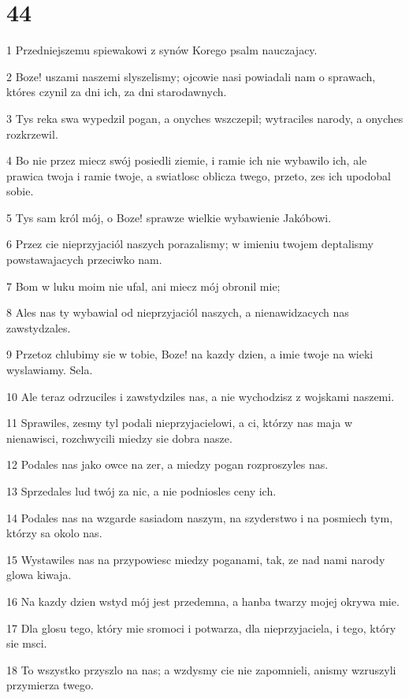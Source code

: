 \chapter{44}

\par 1 Przedniejszemu spiewakowi z synów Korego psalm nauczajacy.
\par 2 Boze! uszami naszemi slyszelismy; ojcowie nasi powiadali nam o sprawach, któres czynil za dni ich, za dni starodawnych.
\par 3 Tys reka swa wypedzil pogan, a onyches wszczepil; wytraciles narody, a onyches rozkrzewil.
\par 4 Bo nie przez miecz swój posiedli ziemie, i ramie ich nie wybawilo ich, ale prawica twoja i ramie twoje, a swiatlosc oblicza twego, przeto, zes ich upodobal sobie.
\par 5 Tys sam król mój, o Boze! sprawze wielkie wybawienie Jakóbowi.
\par 6 Przez cie nieprzyjaciól naszych porazalismy; w imieniu twojem deptalismy powstawajacych przeciwko nam.
\par 7 Bom w luku moim nie ufal, ani miecz mój obronil mie;
\par 8 Ales nas ty wybawial od nieprzyjaciól naszych, a nienawidzacych nas zawstydzales.
\par 9 Przetoz chlubimy sie w tobie, Boze! na kazdy dzien, a imie twoje na wieki wyslawiamy. Sela.
\par 10 Ale teraz odrzuciles i zawstydziles nas, a nie wychodzisz z wojskami naszemi.
\par 11 Sprawiles, zesmy tyl podali nieprzyjacielowi, a ci, którzy nas maja w nienawisci, rozchwycili miedzy sie dobra nasze.
\par 12 Podales nas jako owce na zer, a miedzy pogan rozproszyles nas.
\par 13 Sprzedales lud twój za nic, a nie podniosles ceny ich.
\par 14 Podales nas na wzgarde sasiadom naszym, na szyderstwo i na posmiech tym, którzy sa okolo nas.
\par 15 Wystawiles nas na przypowiesc miedzy poganami, tak, ze nad nami narody glowa kiwaja.
\par 16 Na kazdy dzien wstyd mój jest przedemna, a hanba twarzy mojej okrywa mie.
\par 17 Dla glosu tego, który mie sromoci i potwarza, dla nieprzyjaciela, i tego, który sie msci.
\par 18 To wszystko przyszlo na nas; a wzdysmy cie nie zapomnieli, anismy wzruszyli przymierza twego.
